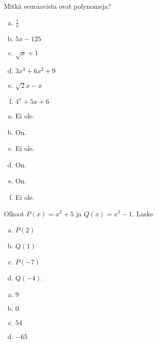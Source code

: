 \begin{tehtavasivu}
\begin{tehtava}
    Mitkä seuraavista ovat polynomeja?
    \begin{enumerate}[a)]
        \item $\frac{1}{x}$
        \item $5x-125$
        \item $\sqrt{x}+1$
        \item $3x^4+6x^2+9$
        \item $\sqrt{2}x-x$
        \item $4^x+5x+6$
    \end{enumerate}
    \begin{vastaus}
        \begin{enumerate}[a)]
            \item Ei ole.
            \item On.
            \item Ei ole.
            \item On.
            \item On.
            \item Ei ole.
        \end{enumerate}
    \end{vastaus}
\end{tehtava}

\begin{tehtava}
    Olkoot $P(x)=x^2+5$ ja $Q(x)=x^3-1$. Laske
    \begin{enumerate}[a)]
        \item $P(2)$
        \item $Q(1)$
        \item $P(-7)$
        \item $Q(-4)$.
    \end{enumerate}
    \begin{vastaus}
        \begin{enumerate}[a)]
            \item $9$ %
            \item $0$ %
            \item $54$ %
            \item $-65$ %
        \end{enumerate}
    \end{vastaus}
\end{tehtava}


\end{tehtavasivu}
